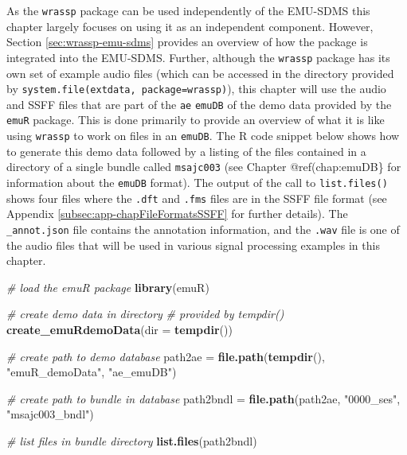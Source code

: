 \documentclass[]{book}
\newenvironment{Shaded}{\begin{snugshade}}{\end{snugshade}}
\newcommand{\CommentTok}[1]{\textcolor[rgb]{0.56,0.35,0.01}{\textit{#1}}}
\newcommand{\DataTypeTok}[1]{\textcolor[rgb]{0.13,0.29,0.53}{#1}}
\newcommand{\KeywordTok}[1]{\textcolor[rgb]{0.13,0.29,0.53}{\textbf{#1}}}
\newcommand{\NormalTok}[1]{#1}
\newcommand{\StringTok}[1]{\textcolor[rgb]{0.31,0.60,0.02}{#1}}
\begin{document}
As the \texttt{wrassp} package can be used independently of the EMU-SDMS this chapter largely focuses on using it as an independent component. However, Section \ref{sec:wrassp-emu-sdms} provides an overview of how the package is integrated into the EMU-SDMS. Further, although the \texttt{wrassp} package has its own set of example audio files (which can be accessed in the directory provided by \texttt{system.file(\textquotesingle{}extdata\textquotesingle{},\ package=\textquotesingle{}wrassp\textquotesingle{})}), this chapter will use the audio and SSFF files that are part of the \texttt{ae} \texttt{emuDB} of the demo data provided by the \texttt{emuR} package. This is done primarily to provide an overview of what it is like using \texttt{wrassp} to work on files in an \texttt{emuDB}. The R code snippet below shows how to generate this demo data followed by a listing of the files contained in a directory of a single bundle called \texttt{msajc003} (see Chapter @ref(chap:emuDB\} for information about the \texttt{emuDB} format). The output of the call to \texttt{list.files()} shows four files where the \texttt{.dft} and \texttt{.fms} files are in the SSFF file format (see Appendix \ref{subsec:app-chapFileFormatsSSFF} for further details). The \texttt{\_annot.json} file contains the annotation information, and the \texttt{.wav} file is one of the audio files that will be used in various signal processing examples in this chapter.

\begin{Shaded}
\begin{Highlighting}[]
\CommentTok{# load the emuR package}
\KeywordTok{library}\NormalTok{(emuR)}

\CommentTok{# create demo data in directory}
\CommentTok{# provided by tempdir()}
\KeywordTok{create_emuRdemoData}\NormalTok{(}\DataTypeTok{dir =} \KeywordTok{tempdir}\NormalTok{())}

\CommentTok{# create path to demo database}
\NormalTok{path2ae =}\StringTok{ }\KeywordTok{file.path}\NormalTok{(}\KeywordTok{tempdir}\NormalTok{(), }\StringTok{"emuR_demoData"}\NormalTok{, }\StringTok{"ae_emuDB"}\NormalTok{)}

\CommentTok{# create path to bundle in database}
\NormalTok{path2bndl =}\StringTok{ }\KeywordTok{file.path}\NormalTok{(path2ae, }\StringTok{"0000_ses"}\NormalTok{, }\StringTok{"msajc003_bndl"}\NormalTok{)}

\CommentTok{# list files in bundle directory}
\KeywordTok{list.files}\NormalTok{(path2bndl)}
\end{Highlighting}
\end{Shaded}
\end{document}
